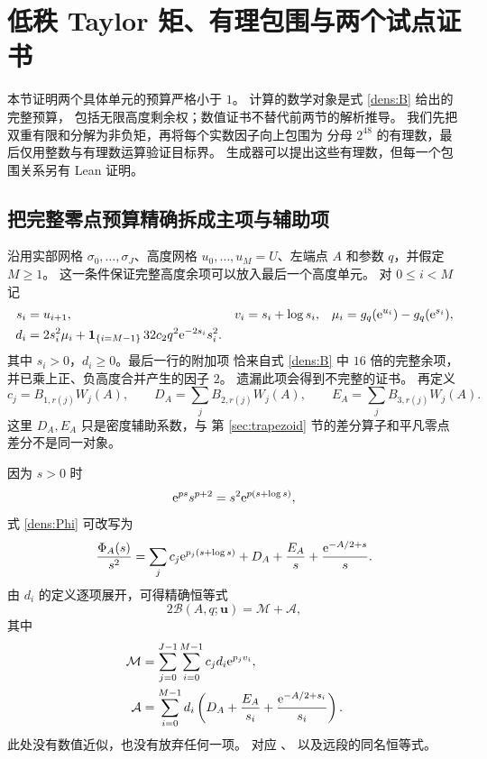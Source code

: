 \section{低秩 Taylor 矩、有理包围与两个试点证书}\label{sec:certificates}

本节证明两个具体单元的预算严格小于 $1$。
计算的数学对象是式 \eqref{dens:B} 给出的完整预算，
包括无限高度剩余权；数值证书不替代前两节的解析推导。
我们先把双重有限和分解为非负矩，再将每个实数因子向上包围为
分母 $2^{48}$ 的有理数，最后仅用整数与有理数运算验证目标界。
生成器可以提出这些有理数，但每一个包围关系另有 Lean 证明。

\subsection{把完整零点预算精确拆成主项与辅助项}

沿用实部网格 $\sigma_0,\ldots,\sigma_J$、高度网格
$u_0,\ldots,u_M=U$、左端点 $A$ 和参数 $q$，并假定 $M\geq1$。
这一条件保证完整高度余项可以放入最后一个高度单元。
对 $0\leq i<M$ 记
\begin{align}
 s_i&=u_{i+1},&
 v_i&=s_i+\log s_i,&
 \mu_i&=g_q(\mathrm e^{u_i})-g_q(\mathrm e^{s_i}),\label{cert:height-data}\\
 d_i&=2s_i^2\mu_i+
  \mathbf{1}_{\{i=M-1\}}\,32c_2q^2\mathrm e^{-2s_i}s_i^2. \label{cert:d}
\end{align}
其中 $s_i>0$，$d_i\geq0$。最后一行的附加项
恰来自式 \eqref{dens:B} 中 $16$ 倍的完整余项，
并已乘上正、负高度合并产生的因子 $2$。
遗漏此项会得到不完整的证书。
再定义
\begin{equation}\label{cert:cDE}
 c_j=B_{1,r(j)}W_j(A),\qquad
 D_A=\sum_jB_{2,r(j)}W_j(A),\qquad
 E_A=\sum_jB_{3,r(j)}W_j(A).
\end{equation}
这里 $D_A,E_A$ 只是密度辅助系数，与
第 \ref{sec:trapezoid} 节的差分算子和平凡零点差分不是同一对象。

因为 $s>0$ 时
\[
 \mathrm e^{ps}s^{p+2}=s^2\mathrm e^{p(s+\log s)},
\]
式 \eqref{dens:Phi} 可改写为
\[
 \frac{\Phi_A(s)}{s^2}
  =\sum_jc_j\mathrm e^{p_j(s+\log s)}
          +D_A+\frac{E_A}{s}+\frac{\mathrm e^{-A/2+s}}{s}.
\]
由 $d_i$ 的定义逐项展开，可得精确恒等式
\begin{equation}\label{cert:decomposition}
 2\mathcal B(A,q;\boldsymbol u)=\mathcal M+\mathcal A,
\end{equation}
其中
\begin{align}
 \mathcal M&=\sum_{j=0}^{J-1}\sum_{i=0}^{M-1}
                   c_jd_i\mathrm e^{p_jv_i},\label{cert:main}\\
 \mathcal A&=\sum_{i=0}^{M-1}d_i
       \left(D_A+\frac{E_A}{s_i}+\frac{\mathrm e^{-A/2+s_i}}{s_i}\right).
                                                     \label{cert:aux}
\end{align}
此处没有数值近似，也没有放弃任何一项。
对应
、
以及远段的同名恒等式。

